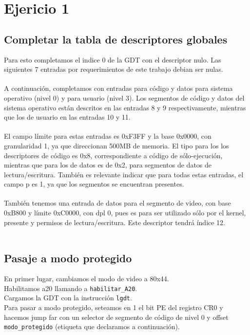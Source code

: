 \section{Ejericio 1}

\subsection{Completar la tabla de descriptores globales}
Para esto completamos el indice 0 de la GDT con el descriptor nulo. Las siguientes 7 entradas por requerimientos de este trabajo debian ser nulas.\\\\
A continuación, completamos con entradas para código y datos para sistema operativo (nivel 0) y para usuario (nivel 3). Los segmentos de código y datos del sistema operativo están descritos en las entradas 8 y 9 respectivamente, mientras que los de usuario en las entradas 10 y 11.\\\\
El campo límite para estas entradas es 0xF3FF y la base 0x0000, con granularidad 1, ya que direccionan  500MB de memoria. El tipo para los los descriptores de código es 0x8, correspondiente a código de sólo-ejecución, mientras que para los de datos es de 0x2, para segmentos de datos de lectura/escritura. También es relevante indicar que para todas estas entradas, el campo p es 1, ya que los segmentos se encuentran presentes.\\\\
También tenemos una entrada de datos para el segmento de video, con base 0xB800 y límite 0xC0000, con dpl 0, pues es para ser utilizado sólo por el kernel, presente y permisos de lectura/escritura. Este descriptor tendrá índice 12.\\\\

\subsection{Pasaje a modo protegido}

En primer lugar, cambiamos el modo de video a 80x44.\\
Habilitamos a20 llamando a \texttt{habilitar\_A20}.\\
Cargamos la GDT  con la instrucción \texttt{lgdt}.\\

Para pasar a modo protegido, seteamos en 1 el bit PE del registro CR0 y hacemos jump far con un selector de segmento de código de nivel 0 y offset \texttt{modo\_protegido} (etiqueta que declaramos a continuación).\\

